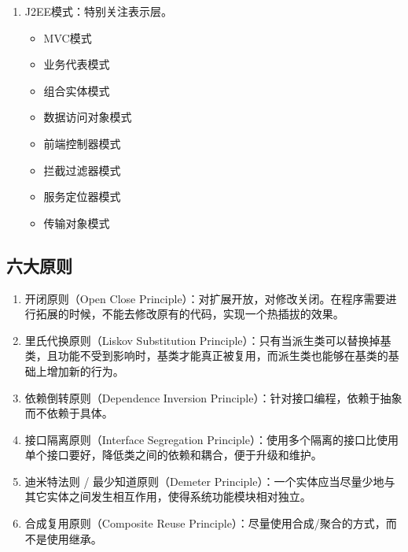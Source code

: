 \begin{enumerate}
    \item J2EE模式：特别关注表示层。
          \begin{itemize}
              \item MVC模式
              \item 业务代表模式
              \item 组合实体模式
              \item 数据访问对象模式
              \item 前端控制器模式
              \item 拦截过滤器模式
              \item 服务定位器模式
              \item 传输对象模式
          \end{itemize}
\end{enumerate}

\vspace{0.5cm}

\subsection{六大原则}

\begin{enumerate}
    \item 开闭原则（Open Close Principle）：对扩展开放，对修改关闭。在程序需要进行拓展的时候，不能去修改原有的代码，实现一个热插拔的效果。

    \item 里氏代换原则（Liskov Substitution Principle）：只有当派生类可以替换掉基类，且功能不受到影响时，基类才能真正被复用，而派生类也能够在基类的基础上增加新的行为。

    \item 依赖倒转原则（Dependence Inversion Principle）：针对接口编程，依赖于抽象而不依赖于具体。

    \item 接口隔离原则（Interface Segregation Principle）：使用多个隔离的接口比使用单个接口要好，降低类之间的依赖和耦合，便于升级和维护。

    \item 迪米特法则 / 最少知道原则（Demeter Principle）：一个实体应当尽量少地与其它实体之间发生相互作用，使得系统功能模块相对独立。

    \item 合成复用原则（Composite Reuse Principle）：尽量使用合成/聚合的方式，而不是使用继承。
\end{enumerate}

\newpage

